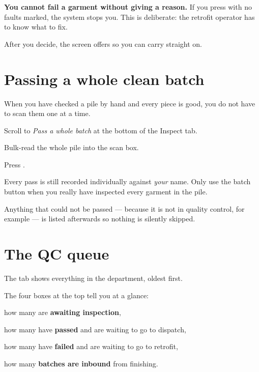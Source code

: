\begin{stopbox}
\textbf{You cannot fail a garment without giving a reason.} If you press
 with no faults marked, the system stops you. This is deliberate: the
retrofit operator has to know what to fix.
\end{stopbox}

After you decide, the screen offers  so you can
carry straight on.

\section{Passing a whole clean batch}

When you have checked a pile by hand and every piece is good, you do not have to
scan them one at a time.

\begin{steps}
  \item Scroll to \emph{Pass a whole batch} at the bottom of the Inspect tab.
  \item Bulk-read the whole pile into the scan box.
  \item Press .
\end{steps}

\begin{warnbox}
Every pass is still recorded individually against \emph{your} name. Only use the
batch button when you really have inspected every garment in the pile.
\end{warnbox}

Anything that could not be passed --- because it is not in quality control, for
example --- is listed afterwards so nothing is silently skipped.

\section{The QC queue}

The  tab shows everything in the department, oldest first.


The four boxes at the top tell you at a glance:

\begin{bullets}
  \item how many are \textbf{awaiting inspection},
  \item how many have \textbf{passed} and are waiting to go to dispatch,
  \item how many have \textbf{failed} and are waiting to go to retrofit,
  \item how many \textbf{batches are inbound} from finishing.
\end{bullets}

